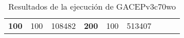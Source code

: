 \begin{table}[H]
\begin{tabular}{|ccrccrccc}
\multicolumn{1}{|c|}{\multirow{-39}{*}{\cellcolor[HTML]{FFFFC7}\textbf{100}}} & \multicolumn{1}{c|}{\multirow{-9}{*}{\cellcolor[HTML]{DDFDFF}100}} & \multicolumn{1}{r|}{\cellcolor[HTML]{DAE8FC}108482}    & \multicolumn{1}{c|}{\multirow{-39}{*}{\cellcolor[HTML]{FFFFC7}\textbf{200}}} & \multicolumn{1}{c|}{\multirow{-10}{*}{\cellcolor[HTML]{DDFDFF}100}} & \multicolumn{1}{r|}{\cellcolor[HTML]{DDFDFF}513407}    &                                                                              &                                                                    &                                                        \\ \cline{1-6}
\end{tabular}
\caption{\label{GACEPv3c70woGRASP}Resultados de la ejecución de GACEPv3c70wo}
\end{table}

